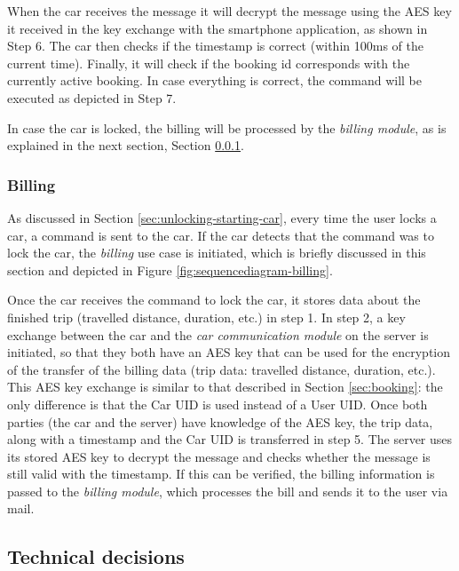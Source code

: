 \documentclass[12pt,a4paper, oneside]{article}
\begin{document}
\par When the car receives the message it will decrypt the message using the AES key it received in the key exchange with the smartphone application, as shown in Step 6. The car then checks if the timestamp is correct (within 100ms of the current time). Finally, it will check if the booking id corresponds with the currently active booking. In case everything is correct, the command will be executed as depicted in Step 7.\\

\par In case the car is locked, the billing will be processed by the \textit{billing module}, as is explained in the next section, Section \ref{sec:usecase-billing}.

\subsubsection{Billing}\label{sec:usecase-billing}
As discussed in Section \ref{sec:unlocking-starting-car}, every time the user locks a car, a command is sent to the car. If the car detects that the command was to lock the car, the \textit{billing} use case is initiated, which is briefly discussed in this section and depicted in Figure \ref{fig:sequencediagram-billing}.\par


Once the car receives the command to lock the car, it stores data about the finished trip (travelled distance, duration, etc.) in step 1. In step 2, a key exchange between the car and the \textit{car communication module} on the server is initiated, so that they both have an AES key that can be used for the encryption of the transfer of the billing data (trip data: travelled distance, duration, etc.). This AES key exchange is similar to that described in Section \ref{sec:booking}: the only difference is that the Car UID is used instead of a User UID. Once both parties (the car and the server) have knowledge of the AES key, the trip data, along with a timestamp and the Car UID is transferred in step 5. The server uses its stored AES key to decrypt the message and checks whether the message is still valid with the timestamp. If this can be verified, the billing information is passed to the \textit{billing module}, which processes the bill and sends it to the user via mail.

\subsection{Technical decisions}\label{sec:technical-decisions}
\end{document}
